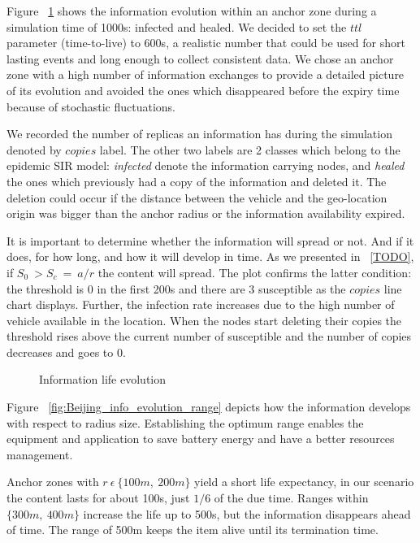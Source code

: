  Figure ~\ref{fig:Beijing_info_evolution} shows the information evolution within
 an anchor zone during a simulation time of 1000s: infected and healed. We
 decided to set the $ttl$ parameter (time-to-live) to 600s, a realistic number
 that could be used for short lasting events and long enough to collect
 consistent data. We chose an anchor zone with a high number of information
 exchanges to provide a detailed picture of its evolution and avoided the ones
 which disappeared before the expiry time because of stochastic fluctuations.
 
 We recorded the number of replicas an information has during the simulation
 denoted by $copies$ label. The other two labels are 2 classes which belong to
 the epidemic SIR model: {\it infected} denote the information carrying nodes,
 and {\it healed} the ones which previously had a copy of the information
 and deleted it. The deletion could occur if the distance between the vehicle
 and the geo-location origin was bigger than the anchor radius or the
 information availability expired.
 
 It is important to determine whether the information will spread or not. And if
 it does, for how long, and how it will develop in time. As we presented in
 ~\ref{TODO}, if $S_{0}\ > S_{c}\ =\ a/r$ the content will spread. The plot
 confirms the latter condition: the threshold is 0 in the first 200s and there
 are 3 susceptible as the $copies$ line chart displays. Further, the infection
 rate increases due to the high number of vehicle available in the location.
 When the nodes start deleting their copies the threshold rises above the
 current number of susceptible and the number of copies decreases and goes to
 0.
 
 \begin{figure}[t]
	\centering
	\def\svgwidth{\columnwidth}
	
	\caption{Information life evolution}
 	\label{fig:Beijing_info_evolution}
 \end{figure}
 
 Figure ~\ref{fig:Beijing_info_evolution_range} depicts how the information
 develops with respect to radius size. Establishing the optimum range enables
 the equipment and application to save battery energy and have a better
 resources management. 
 
 Anchor zones with $r\ \epsilon\ \{100m,\ 200m\}$ yield a short life expectancy,
 in our scenario the content lasts for about 100s, just $1/6$ of the due time.
 Ranges within $\{300m,\ 400m\}$ increase the life up to 500s, but the
 information disappears ahead of time. The range of 500m keeps the item alive
 until its termination time.
 
